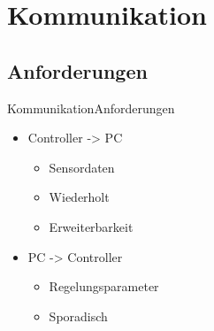 ﻿\section{Kommunikation}
\subsection{Anforderungen}
\begin{frame}{Kommunikation}{Anforderungen}
  \begin{itemize}
    \item Controller -> PC
    \begin{itemize}
    \item Sensordaten
    \item Wiederholt
    \item Erweiterbarkeit
    \end{itemize}
    \item PC -> Controller
    \begin{itemize}
      \item Regelungsparameter
      \item Sporadisch
    \end{itemize}
  \end{itemize}
\end{frame}
